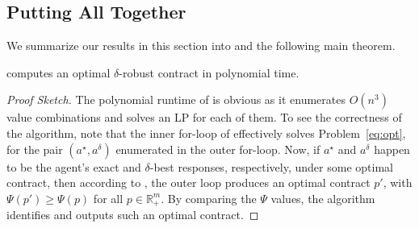 \subsection{Putting All Together}

We summarize our results in this section into  and the following main theorem.

\begin{theorem}
	 computes an optimal $\delta$-robust contract in polynomial time.
\end{theorem}

\begin{proof}[Proof Sketch]
	The polynomial runtime of  is obvious as it enumerates $O(n^3)$ value combinations and solves an LP for each of them.
	To see the correctness of the algorithm, note that the inner for-loop of  effectively solves Problem~\eqref{eq:opt}, for the pair $(a^\star, a^\delta)$ enumerated in the outer for-loop.
	Now, if $a^\star$ and $a^\delta$ happen to be the agent's exact and $\delta$-best responses, respectively, under some optimal contract, then according to , the outer loop produces an optimal contract $p'$, with $\Psi(p') \ge \Psi(p)$ for all $p \in \mathbb{R}_+^m$. By comparing the $\Psi$ values, the algorithm identifies and outputs such an optimal contract.
\end{proof}

